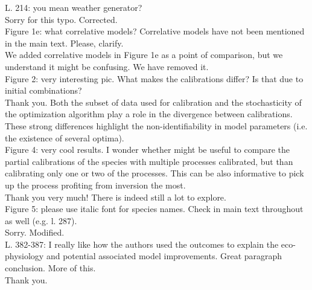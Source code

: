 \documentclass[a4paper, 11pt]{article}
\begin{document}
\noindent L. 214: you mean weather generator?\\
\textcolor{customblue}{Sorry for this typo. Corrected.}\\

\noindent Figure 1e: what correlative models? Correlative models have not been mentioned in the main text. Please, clarify.\\
\textcolor{customblue}{We added correlative models in Figure 1e as a point of comparison, but we understand it might be confusing. We have removed it.}\\

\noindent Figure 2: very interesting pic. What makes the calibrations differ? Is that due to initial combinations?\\
\textcolor{customblue}{Thank you. Both the subset of data used for calibration and the stochasticity of the optimization algorithm play a role in the divergence between calibrations. These strong differences highlight the non-identifiability in model parameters (i.e. the existence of several optima).}\\

\noindent Figure 4: very cool results. I wonder whether might be useful to compare the partial calibrations of the species with multiple processes calibrated, but than calibrating only one or two of the processes. This can be also informative to pick up the process profiting from inversion the most.\\
\textcolor{customblue}{Thank you very much! There is indeed still a lot to explore.}\\

\noindent Figure 5: please use italic font for species names. Check in main text throughout as well (e.g. l. 287).\\
\textcolor{customblue}{Sorry. Modified.}\\

\noindent L. 382-387: I really like how the authors used the outcomes to explain the eco-physiology and potential associated model improvements. Great paragraph conclusion. More of this.\\
\textcolor{customblue}{Thank you.}\\


\clearpage
\renewcommand\refname{References}

\end{document}
